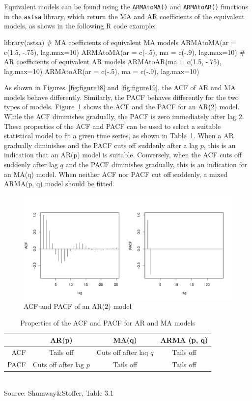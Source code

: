 Equivalent models can be found using the \texttt{ARMAtoMA()} and \texttt{ARMAtoAR()} functions in the \texttt{astsa} library, which return the MA and AR coefficients of the equivalent models, as shows in the following R code example:

\begin{Rcode}
library(astsa)
# MA coefficients of equivalent MA models
ARMAtoMA(ar = c(1.5, -.75), lag.max=10)
ARMAtoMA(ar = c(-.5), ma = c(-.9), lag.max=10)
# AR coefficients of equivalent AR models
ARMAtoAR(ma = c(1.5, -.75), lag.max=10)
ARMAtoAR(ar = c(-.5), ma = c(-.9), lag.max=10)
\end{Rcode}

As shown in Figures~\ref{fig:figure18} and \ref{fig:figure19}, the ACF of AR and MA models behave differently. Similarly, the PACF behaves differently for the two types of models. Figure~\ref{fig:figure20} shows the ACF and the PACF for an AR(2) model. While the ACF diminishes gradually, the PACF is zero immediately after lag $2$. These properties of the ACF and PACF can be used to select a suitable statistical model to fit a given time series, as shown in Table~\ref{tab:modelselection}. When a AR gradually diminishes and the PACF cuts off suddenly after a lag $p$, this is an indication that an AR(p) model is suitable. Conversely, when the ACF cuts off suddenly after lag $q$ and the PACF diminishes gradually, this is an indication for an MA(q) model. When neither ACF nor PACF cut off suddenly, a mixed ARMA(p, q) model should be fitted.


\begin{figure}
\centering
\includegraphics[width=.9\textwidth]{figure20.pdf}
\caption{ACF and PACF of an AR(2) model}
\label{fig:figure20}
\end{figure}


\begin{table}
\centering
\renewcommand{\arraystretch}{1.5}
\begin{tabular}{r|c|c|c} \hline
 & AR(p) & MA(q) & ARMA (p, q) \\ \hline
 ACF & Tails off & Cuts off after laq $q$ & Tails off \\
 PACF & Cuts off after lag $p$ & Tails off & Tails off \\ \hline
\end{tabular} \\

\vspace{\baselineskip}
\scriptsize Source: Shumway\&Stoffer, Table 3.1 \normalsize
\caption{Properties of the ACF and PACF for AR and MA models}
\label{tab:modelselection}
\end{table}

